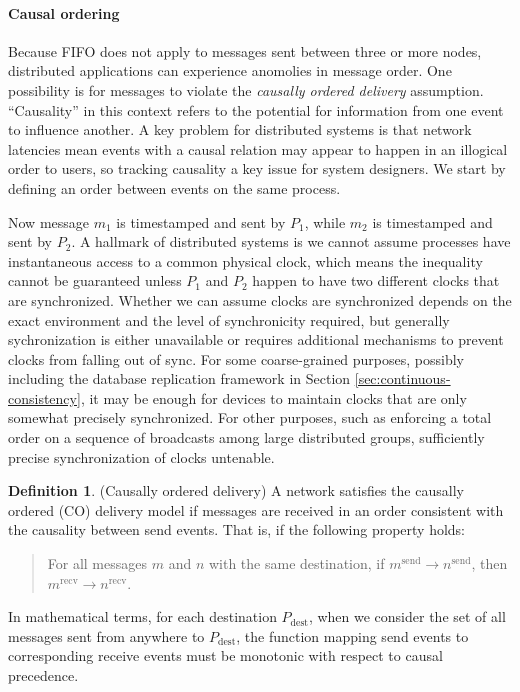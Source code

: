 \documentclass[]             %
{NASA}                       %
\theoremstyle{definition}
\newtheorem{definition}{Definition}[section]
\begin{document}
\paragraph{Causal ordering}
Because FIFO does not apply to messages sent between three or more
nodes, distributed applications can experience anomolies in message
order. One possibility is for messages to violate the \emph{causally
  ordered delivery} assumption. ``Causality'' in this context refers
to the potential for information from one event to influence
another. A key problem for distributed systems is that network
latencies mean events with a causal relation may appear to happen in
an illogical order to users, so tracking causality a key issue for
system designers. We start by defining an order between events on the
same process.

Now message $m_1$ is timestamped and sent by $P_1$, while $m_2$ is
timestamped and sent by $P_2$. A hallmark of distributed systems is we
cannot assume processes have instantaneous access to a common physical
clock, which means the inequality cannot be guaranteed unless $P_1$
and $P_2$ happen to have two different clocks that are
synchronized. Whether we can assume clocks are synchronized depends on
the exact environment and the level of synchronicity required, but
generally sychronization is either unavailable or requires additional
mechanisms to prevent clocks from falling out of sync. For some
coarse-grained purposes, possibly including the database replication
framework in Section \ref{sec:continuous-consistency}, it may be
enough for devices to maintain clocks that are only somewhat precisely
synchronized. For other purposes, such as enforcing a total order on a
sequence of broadcasts among large distributed groups, sufficiently
precise synchronization of clocks untenable.


\begin{definition}(Causally ordered delivery)
  \label{def:causalorder}
  A network satisfies the causally ordered (CO) delivery model if
  messages are received in an order consistent with the causality
  between send events. That is, if the following property holds:
  \begin{quote}
  For all messages $m$ and $n$ with the same destination, if
  $m^\textrm{send} \to n^\textrm{send}$, then $m^\textrm{recv} \to
  n^\textrm{recv}$.
  \end{quote}
  In mathematical terms, for each destination $P_\mathrm{dest}$, when
  we consider the set of all messages sent from anywhere to
  $P_\mathrm{dest}$, the function mapping send events to corresponding
  receive events must be monotonic with respect to causal
  precedence.
\end{definition}
\end{document}
